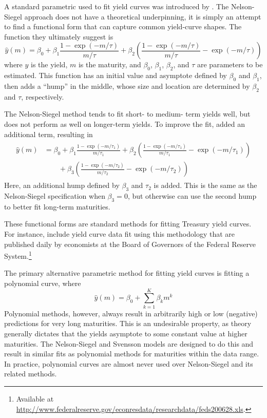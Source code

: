 \documentclass[12pt]{article}
\begin{document}
A standard parametric used to fit yield curves was introduced by \citet{nelsonsiegel1987}. The Nelson-Siegel approach does not have a theoretical underpinning, it is simply an attempt to find a functional form that can capture common yield-curve shapes. The function they ultimately suggest is
\begin{equation}
\hat{y}(m) = \beta_0
    + \beta_1 \frac{1-\exp(-m/\tau)}{m/\tau}
    + \beta_2 \left( \frac{1-\exp(-m/\tau)}{m/\tau} - \exp(-m/\tau) \right)
\label{eq:ns}
\end{equation}
where $y$ is the yield, $m$ is the maturity, and $\beta_0$, $\beta_1$, $\beta_2$, and $\tau$ are parameters to be estimated. This function has an initial value and asymptote defined by $\beta_0$ and $\beta_1$, then adds a ``hump'' in the middle, whose size and location are determined by $\beta_2$ and $\tau$, respectively.

The Nelson-Siegel method tends to fit short- to medium- term yields well, but does not perform as well on longer-term yields. To improve the fit, \citet{svensson1994} added an additional term, resulting in
\begin{align}
\begin{split}
\hat{y}(m) &= \beta_0
    + \beta_1 \frac{1-\exp(-m/\tau_1)}{m/\tau_1}
    + \beta_2 \left( \frac{1-\exp(-m/\tau_1)}{m/\tau_1} - \exp(-m/\tau_1) \right) \\
    &\qquad+ \beta_3 \left( \frac{1-\exp(-m/\tau_2)}{m/\tau_2} - \exp(-m/\tau_2) \right)
\end{split} \label{eq:svensson}
\end{align}
Here, an additional hump defined by $\beta_3$ and $\tau_2$ is added. This is the same as the Nelson-Siegel specification when $\beta_3 = 0$, but otherwise can use the second hump to better fit long-term maturities.

These functional forms are standard methods for fitting Treasury yield curves. For instance, \citet{gsw06} include yield curve data fit using this methodology that are published daily by economists at the Board of Governors of the Federal Reserve System.\footnote{Available at \url{http://www.federalreserve.gov/econresdata/researchdata/feds200628.xls}.}

The primary alternative parametric method for fitting yield curves is fitting a polynomial curve, where
\begin{equation*}
\hat{y}(m) = \beta_0 + \sum_{k=1}^K \beta_k m^k
\end{equation*}
Polynomial methods, however, always result in arbitrarily high or low (negative) predictions for very long maturities. This is an undesirable property, as theory generally dictates that the yields asymptote to some constant value at higher maturities. The Nelson-Siegel and Svensson models are designed to do this and result in similar fits as polynomial methods for maturities within the data range. In practice, polynomial curves are almost never used over Nelson-Siegel and its related methods.
\end{document}
